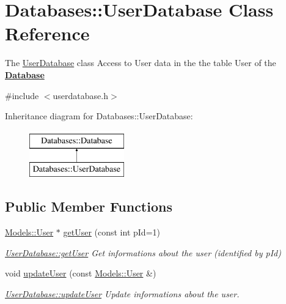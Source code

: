 \hypertarget{classDatabases_1_1UserDatabase}{}\section{Databases\+:\+:User\+Database Class Reference}
\label{classDatabases_1_1UserDatabase}


The \hyperlink{classDatabases_1_1UserDatabase}{User\+Database} class Access to User data in the the table User of the {\bfseries \hyperlink{classDatabases_1_1Database}{Database}}  




{\ttfamily \#include $<$userdatabase.\+h$>$}

Inheritance diagram for Databases\+:\+:User\+Database\+:\begin{figure}[H]
\begin{center}
\leavevmode
\includegraphics[height=2.000000cm]{d0/d33/classDatabases_1_1UserDatabase}
\end{center}
\end{figure}
\subsection*{Public Member Functions}
\begin{DoxyCompactItemize}
\item 
\hyperlink{classModels_1_1User}{Models\+::\+User} $\ast$ \hyperlink{classDatabases_1_1UserDatabase_a476a2b649cc61870a59d6f8df0b376e4}{get\+User} (const int p\+Id=1)
\begin{DoxyCompactList}\small\item\em \hyperlink{classDatabases_1_1UserDatabase_a476a2b649cc61870a59d6f8df0b376e4}{User\+Database\+::get\+User} Get informations about the user (identified by \textquotesingle{}p\+Id\textquotesingle{}) \end{DoxyCompactList}\item 
\hypertarget{classDatabases_1_1UserDatabase_a79cd7ce66a5dc13f91a59eb106edd871}{}void \hyperlink{classDatabases_1_1UserDatabase_a79cd7ce66a5dc13f91a59eb106edd871}{update\+User} (const \hyperlink{classModels_1_1User}{Models\+::\+User} \&)\label{classDatabases_1_1UserDatabase_a79cd7ce66a5dc13f91a59eb106edd871}

\begin{DoxyCompactList}\small\item\em \hyperlink{classDatabases_1_1UserDatabase_a79cd7ce66a5dc13f91a59eb106edd871}{User\+Database\+::update\+User} Update informations about the user. \end{DoxyCompactList}\end{DoxyCompactItemize}
